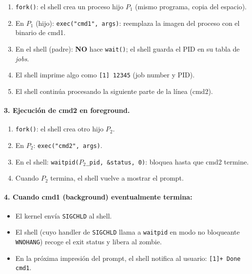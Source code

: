 \documentclass[11pt,a4paper]{article}
\begin{document}
\begin{enumerate}[leftmargin=*,nosep,label=2.\arabic*)]
    \item \texttt{fork()}: el shell crea un proceso hijo
        $P_1$ (mismo programa, copia del espacio).
    \item En $P_1$ (hijo): \texttt{exec("cmd1", args)}: reemplaza
        la imagen del proceso con el binario de cmd1.
    \item En el shell (padre): \textbf{NO} hace \texttt{wait()}; el
        shell guarda el PID en su tabla de \emph{jobs}.
    \item El shell imprime algo como \texttt{[1] 12345} (job number
        y PID).
    \item El shell continúa procesando la siguiente parte de la
        línea (cmd2).
\end{enumerate}

\paragraph{3. Ejecución de cmd2 en foreground.}

\begin{enumerate}[leftmargin=*,nosep,label=3.\arabic*)]
    \item \texttt{fork()}: el shell crea otro hijo $P_2$.
    \item En $P_2$: \texttt{exec("cmd2", args)}.
    \item En el shell: \texttt{waitpid($P_2$\_pid, \&status, 0)}:
        bloquea hasta que cmd2 termine.
    \item Cuando $P_2$ termina, el shell vuelve a mostrar el prompt.
\end{enumerate}

\paragraph{4. Cuando cmd1 (background) eventualmente termina:}

\begin{itemize}[leftmargin=*,nosep]
    \item El kernel envía \texttt{SIGCHLD} al shell.
    \item El shell (cuyo handler de \texttt{SIGCHLD} llama a
        \texttt{waitpid} en modo no bloqueante \texttt{WNOHANG})
        recoge el exit status y libera al zombie.
    \item En la próxima impresión del prompt, el shell notifica al
        usuario: \texttt{[1]+ Done   cmd1}.
\end{itemize}
\end{document}
